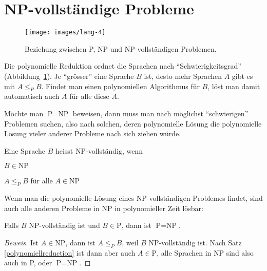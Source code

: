 %
%
%
\section{NP-vollständige Probleme}
\begin{figure}
\begin{center}
\texttt{[image: images/lang-4]}
\end{center}
\caption{Beziehung zwischen P, NP und NP-vollständigen Problemen.
\label{pnpnpcomplete}}
\end{figure}%
Die polynomielle Reduktion ordnet die Sprachen nach ``Schwierigkeitsgrad''
(Abbildung~\ref{pnpnpcomplete}).
Je ``grösser'' eine Sprache $B$ ist, desto mehr Sprachen $A$ gibt es
mit $A\le_P B$. Findet man einen polynomiellen Algorithmus für $B$,
löst man damit automatisch auch $A$ für alle diese $A$. 

Möchte man $\text{P} = \text{NP}$ beweisen, dann muss man nach
möglichst ``schwierigen'' Problemen suchen, also nach solchen,
deren polynomielle Lösung die polynomielle Lösung vieler anderer
Probleme nach sich ziehen würde. 

\begin{definition}
%
Eine Sprache $B$ heisst NP-vollständig, wenn 
\begin{compactenum}
\item $B\in\text{NP}$
\item $A\le_P B$ für alle $A\in\text{NP}$
\end{compactenum}
\end{definition}

Wenn man die polynomielle Lösung eines NP-vollständigen Problemes
findet, sind auch alle anderen Probleme in NP in polynomieller Zeit
lösbar:

\begin{satz}
Falls $B$ NP-vollständig ist und $B\in\text{P}$, dann ist
$\text{P}=\text{NP}$.
\end{satz}

\begin{proof}[Beweis]
Ist $A\in\text{NP}$, dann ist $A\le_P B$, weil $B$ NP-vollständig ist.
Nach Satz \ref{polynomiellreduction} ist dann aber auch
$A\in\text{P}$, alle Sprachen
in NP sind also auch in P, oder $\text{P}=\text{NP}$.
\end{proof}

